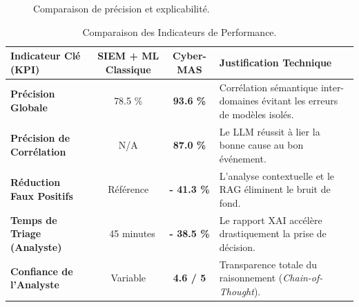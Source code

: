 \documentclass[a4paper, 12pt]{report}
\begin{document}
\begin{figure}[H]
    \centering
    \caption[Comparaison de précision et explicabilité]{Comparaison de précision et explicabilité.}
    \label{fig:kpi_chart}
\end{figure}

\begin{table}[htbp]
\centering
\caption[Comparaison des Indicateurs de Performance]{Comparaison des Indicateurs de Performance.}
\label{tab:kpi_comparison}
\vspace{0.2cm}
\begin{tabular}{|l|c|c|>{\raggedright\arraybackslash}p{4cm}|}
\hline
\textbf{Indicateur Clé (KPI)} & \textbf{SIEM + ML Classique} & \textbf{Cyber-MAS} & \textbf{Justification Technique} \\ \hline
\textbf{Précision Globale} & 78.5 \% & \textbf{93.6 \%} & Corrélation sémantique inter-domaines évitant les erreurs de modèles isolés. \\ \hline
\textbf{Précision de Corrélation} & N/A & \textbf{87.0 \%} & Le LLM réussit à lier la bonne cause au bon événement. \\ \hline
\textbf{Réduction Faux Positifs} & Référence & \textbf{- 41.3 \%} & L'analyse contextuelle et le RAG éliminent le bruit de fond. \\ \hline
\textbf{Temps de Triage (Analyste)} & ~ 45 minutes & \textbf{- 38.5 \%} & Le rapport XAI accélère drastiquement la prise de décision. \\ \hline
\textbf{Confiance de l'Analyste} & Variable & \textbf{4.6 / 5} & Transparence totale du raisonnement (\textit{Chain-of-Thought}). \\ \hline
\end{tabular}
\end{table}
\end{document}
